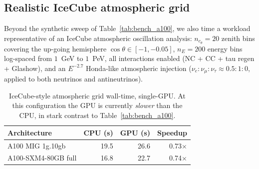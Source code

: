 
\subsection{Realistic IceCube atmospheric grid}
\label{sec:perf_icecube}

Beyond the synthetic sweep of Table~\ref{tab:bench_a100}, we also time
a workload representative of an IceCube atmospheric oscillation
analysis: $n_{c_\theta}\!=\!20$ zenith bins covering the up-going
hemisphere $\cos\theta \in [-1, -0.05]$, $n_E\!=\!200$ energy bins
log-spaced from $1$~GeV to $1$~PeV, all interactions enabled
(NC + CC + tau regen + Glashow), and an $E^{-2.7}$ Honda-like
atmospheric injection ($\nu_e : \nu_\mu : \nu_\tau \approx 0.5 : 1 : 0$,
applied to both neutrinos and antineutrinos).

\begin{table}[t]
\centering
\small
\begin{tabular}{l r r r}
\toprule
Architecture & CPU (s) & GPU (s) & Speedup \\
\midrule
A100 MIG 1g.10gb     & 19.5 & 26.6 & 0.73$\times$ \\
A100-SXM4-80GB full  & 16.8 & 22.7 & 0.74$\times$ \\
\bottomrule
\end{tabular}
\caption{IceCube-style atmospheric grid wall-time, single-GPU. At
this configuration the GPU is currently \emph{slower} than the CPU,
in stark contrast to Table~\ref{tab:bench_a100}.}
\label{tab:bench_icecube}
\end{table}

